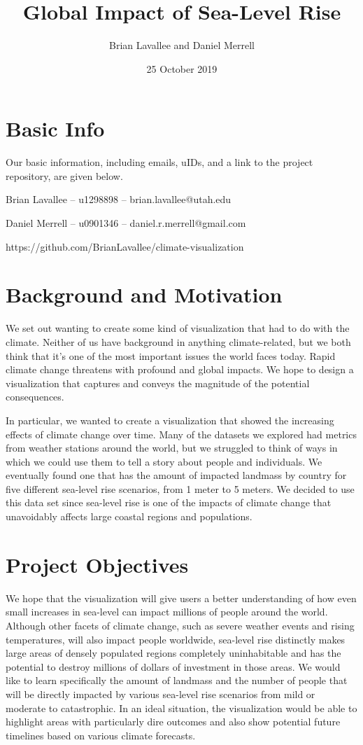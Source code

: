\documentclass[12pt]{article}
\title{Global Impact of Sea-Level Rise}
\author{Brian Lavallee and Daniel Merrell}
\date{25 October 2019}
\begin{document}
	\maketitle

	\section{Basic Info}
		Our basic information, including emails, uIDs, and a link to the project repository, are given below.

		Brian Lavallee -- u1298898 -- brian.lavallee@utah.edu

		Daniel Merrell -- u0901346 -- daniel.r.merrell@gmail.com

		https://github.com/BrianLavallee/climate-visualization

	\section{Background and Motivation}
		We set out wanting to create some kind of visualization that had to do with the climate.
		Neither of us have background in anything climate-related, but we both think that it’s one of the most important issues the world faces today.
		Rapid climate change threatens with profound and global impacts.
		We hope to design a visualization that captures and conveys the magnitude of the potential consequences.

		In particular, we wanted to create a visualization that showed the increasing effects of climate change over time.
		Many of the datasets we explored had metrics from weather stations around the world, but we struggled to think of ways in which we could use them to tell a story about people and individuals.
		We eventually found one that has the amount of impacted landmass by country for five different sea-level rise scenarios, from 1 meter to 5 meters.
		We decided to use this data set since sea-level rise is one of the impacts of climate change that unavoidably affects large coastal regions and populations.

	\section{Project Objectives}
		We hope that the visualization will give users a better understanding of how even small increases in sea-level can impact millions of people around the world.
		Although other facets of climate change, such as severe weather events and rising temperatures, will also impact people worldwide, sea-level rise distinctly makes large areas of densely populated regions completely uninhabitable and has the potential to destroy millions of dollars of investment in those areas.
		We would like to learn specifically the amount of landmass and the number of people that will be directly impacted by various sea-level rise scenarios from mild or moderate to catastrophic.
		In an ideal situation, the visualization would be able to highlight areas with particularly dire outcomes and also show potential future timelines based on various climate forecasts.
\end{document}
